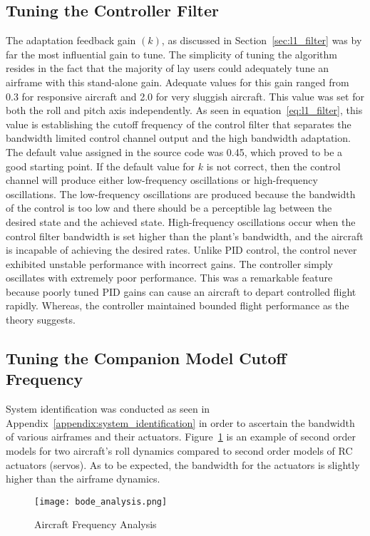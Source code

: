 \subsection{Tuning the Controller Filter}
The adaptation feedback gain $(k)$, as discussed in Section~\ref{sec:l1_filter} was by far the most influential gain to tune.  The simplicity of tuning the \Lone algorithm resides in the fact that the majority of lay users could adequately tune an airframe with this stand-alone gain.  Adequate values for this gain ranged from 0.3 for responsive aircraft and 2.0 for very sluggish aircraft.  This value was set for both the roll and pitch axis independently.  As seen in equation~\ref{eq:l1_filter}, this value is establishing the cutoff frequency of the control filter that separates the bandwidth limited control channel output and the high bandwidth adaptation.  The default value assigned in the source code was 0.45, which proved to be a good starting point.  If the default value for $k$ is not correct, then the control channel will produce either low-frequency oscillations or high-frequency oscillations.  The low-frequency oscillations are produced because the bandwidth of the control is too low and there should be a perceptible lag between the desired state and the achieved state.  High-frequency oscillations occur when the control filter bandwidth is set higher than the plant's bandwidth, and the aircraft is incapable of achieving the desired rates.  Unlike \ac{PID} control, the \Lone control never exhibited unstable performance with incorrect gains.  The controller simply oscillates with extremely poor performance.  This was a remarkable feature because poorly tuned \ac{PID} gains can cause an aircraft to depart controlled flight rapidly. Whereas, the \Lone controller maintained bounded flight performance as the theory suggests.  

\subsection{Tuning the Companion Model Cutoff Frequency}
System identification was conducted as seen in Appendix~\ref{appendix:system_identification} in order to ascertain the bandwidth of various airframes and their actuators.  Figure~\ref{fig:bode_analysis} is an example of second order models for two aircraft's roll dynamics compared to second order models of \ac{RC} actuators (servos).  As to be expected, the bandwidth for the actuators is slightly higher than the airframe dynamics.  
\begin{figure}[h!]
 \centering
  \texttt{[image: bode\_analysis.png]}
  \caption{Aircraft Frequency Analysis }
  \label{fig:bode_analysis}
\end{figure}

